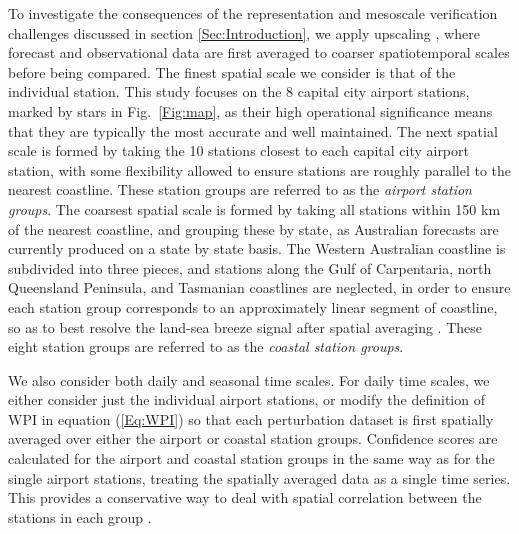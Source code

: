 \documentclass[twocol]{ametsoc}
\begin{document}
To investigate the consequences of the representation and mesoscale verification challenges discussed in section \ref{Sec:Introduction}, we apply upscaling \citep{ebert08}, where forecast and observational data are first averaged to coarser spatiotemporal scales before being compared. The finest spatial scale we consider is that of the individual station. This study focuses on the 8 capital city airport stations, marked by stars in Fig.~\ref{Fig:map}, as their high operational significance means that they are typically the most accurate and well maintained. The next spatial scale is formed by taking the 10 stations closest to each capital city airport station, with some flexibility allowed to ensure stations are roughly parallel to the nearest coastline. These station groups are referred to as the \textit{airport station groups}. The coarsest spatial scale is formed by taking all stations within 150 km of the nearest coastline, and grouping these by state, as Australian forecasts are currently produced on a state by state basis. The Western Australian coastline is subdivided into three pieces, and stations along the Gulf of Carpentaria, north Queensland Peninsula, and Tasmanian coastlines are neglected, in order to ensure each station group corresponds to an approximately linear segment of coastline, so as to best resolve the land-sea breeze signal after spatial averaging \citep[e.g.][]{vincent16}. These eight station groups are referred to as the \textit{coastal station groups}.

We also consider both daily and seasonal time scales. For daily time scales, we either consider just the individual airport stations, or modify the definition of WPI in equation (\ref{Eq:WPI}) so that each perturbation dataset is first spatially averaged over either the airport or coastal station groups. Confidence scores are calculated for the airport and coastal station groups in the same way as for the single airport stations, treating the spatially averaged data as a single time series. This provides a conservative way to deal with spatial correlation between the stations in each group \citep{griffiths17}. 
\end{document}
